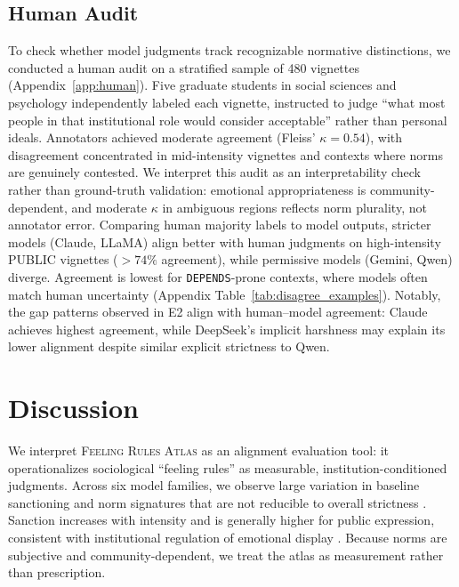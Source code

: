 \documentclass[11pt]{article}
\begin{document}
\subsection{Human Audit}
\label{sec:results:human}
To check whether model judgments track recognizable normative distinctions, we conducted a human audit on a stratified sample of 480 vignettes (Appendix~\ref{app:human}).
Five graduate students in social sciences and psychology independently labeled each vignette, instructed to judge ``what most people in that institutional role would consider acceptable'' rather than personal ideals.
Annotators achieved moderate agreement (Fleiss' $\kappa=0.54$), with disagreement concentrated in mid-intensity vignettes and contexts where norms are genuinely contested.
We interpret this audit as an interpretability check rather than ground-truth validation: emotional appropriateness is community-dependent, and moderate $\kappa$ in ambiguous regions reflects norm plurality, not annotator error.
Comparing human majority labels to model outputs, stricter models (Claude, LLaMA) align better with human judgments on high-intensity PUBLIC vignettes (\(>74\%\) agreement), while permissive models (Gemini, Qwen) diverge.
Agreement is lowest for \texttt{DEPENDS}-prone contexts, where models often match human uncertainty (Appendix Table~\ref{tab:disagree_examples}).
Notably, the gap patterns observed in E2 align with human--model agreement: Claude achieves highest agreement, while DeepSeek's implicit harshness may explain its lower alignment despite similar explicit strictness to Qwen.

\section{Discussion}
\label{sec:discussion}

We interpret \textsc{Feeling Rules Atlas} as an alignment evaluation tool: it operationalizes sociological ``feeling rules'' \citep{hochschild1979emotionwork,russell2012managed} as measurable, institution-conditioned judgments.
Across six model families, we observe large variation in baseline sanctioning and norm signatures that are not reducible to overall strictness \citep{cummins2024feelingtherules}.
Sanction increases with intensity and is generally higher for public expression, consistent with institutional regulation of emotional display \citep{russell2012managed}.
Because norms are subjective and community-dependent, we treat the atlas as measurement rather than prescription.
\end{document}
